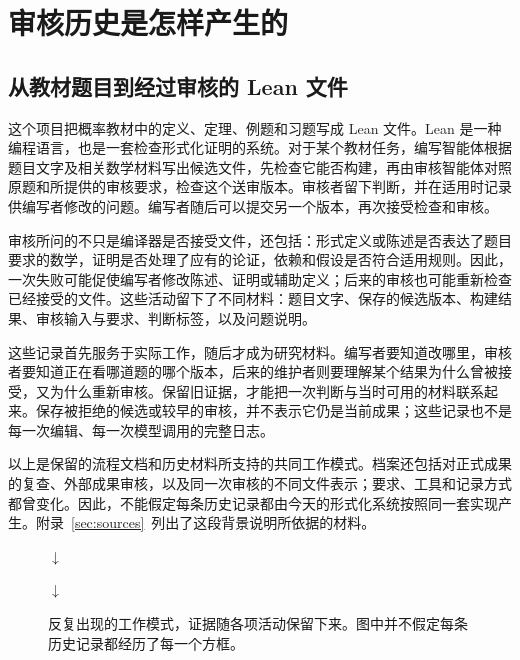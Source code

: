 \section{审核历史是怎样产生的}
\label{sec:introduction}
\subsection{从教材题目到经过审核的 Lean 文件}
\label{subsec:workflow}
这个项目把概率教材中的定义、定理、例题和习题写成 Lean 文件。Lean 是一种编程语言，也是一套检查形式化证明的系统。对于某个教材任务，编写智能体根据题目文字及相关数学材料写出候选文件，先检查它能否构建，再由审核智能体对照原题和所提供的审核要求，检查这个送审版本。审核者留下判断，并在适用时记录供编写者修改的问题。编写者随后可以提交另一个版本，再次接受检查和审核。

审核所问的不只是编译器是否接受文件，还包括：形式定义或陈述是否表达了题目要求的数学，证明是否处理了应有的论证，依赖和假设是否符合适用规则。因此，一次失败可能促使编写者修改陈述、证明或辅助定义；后来的审核也可能重新检查已经接受的文件。这些活动留下了不同材料：题目文字、保存的候选版本、构建结果、审核输入与要求、判断标签，以及问题说明。

这些记录首先服务于实际工作，随后才成为研究材料。编写者要知道改哪里，审核者要知道正在看哪道题的哪个版本，后来的维护者则要理解某个结果为什么曾被接受，又为什么重新审核。保留旧证据，才能把一次判断与当时可用的材料联系起来。保存被拒绝的候选或较早的审核，并不表示它仍是当前成果；这些记录也不是每一次编辑、每一次模型调用的完整日志。

以上是保留的流程文档和历史材料所支持的共同工作模式。档案还包括对正式成果的复查、外部成果审核，以及同一次审核的不同文件表示；要求、工具和记录方式都曾变化。因此，不能假定每条历史记录都由今天的形式化系统按照同一套实现产生。附录~\ref{sec:sources}~列出了这段背景说明所依据的材料。

\begin{figure}[htbp]
\centering\small
{}
\par\smallskip $\downarrow$ \par\smallskip
{}
\par\smallskip $\downarrow$ \par\smallskip
{}
\caption{反复出现的工作模式，证据随各项活动保留下来。图中并不假定每条历史记录都经历了每一个方框。}
\label{fig:work-pattern}
\end{figure}

